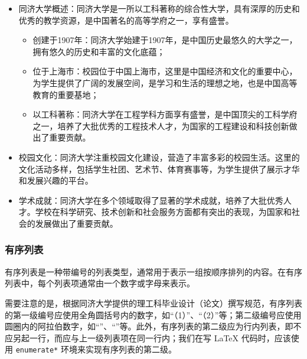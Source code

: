 \begin{itemize}
    \item 同济大学概述：同济大学是一所以工科著称的综合性大学，具有深厚的历史和优秀的教学资源，是中国著名的高等学府之一，享有盛誉。
    \begin{itemize}
        \item 创建于1907年：同济大学始建于1907年，是中国历史最悠久的大学之一，拥有悠久的历史和丰富的文化底蕴；
        \item 位于上海市：校园位于中国上海市，这里是中国经济和文化的重要中心，为学生提供了广阔的发展空间，是学习和生活的理想之地，也是中国高等教育的重要基地；
        \item 以工科著称：同济大学在工程学科方面享有盛誉，是中国顶尖的工科学府之一，培养了大批优秀的工程技术人才，为国家的工程建设和科技创新做出了重要贡献。
    \end{itemize}
    \item 校园文化：同济大学注重校园文化建设，营造了丰富多彩的校园生活。这里的文化活动多样，包括学生社团、艺术节、体育赛事等，为学生提供了展示才华和发展兴趣的平台。
    \item 学术成就：同济大学在多个领域取得了显著的学术成就，培养了大批优秀人才。学校在科学研究、技术创新和社会服务方面都有突出的表现，为国家和社会的发展做出了重要贡献。
\end{itemize}

\subsubsection{有序列表}

有序列表是一种带编号的列表类型，通常用于表示一组按顺序排列的内容。在有序列表中，每个列表项通常由一个数字或字母来表示。

需要注意的是，根据同济大学提供的理工科毕业设计（论文）撰写规范，有序列表的第一级编号应使用全角圆括号内的数字，如“（1）”、“（2）”等；第二级编号应使用圆圈内的阿拉伯数字，如“”、“”等。此外，有序列表的第二级应为行内列表，即不应另起一行，而应与上一级列表项在同一行内；我们在写 \LaTeX{} 代码时，应该使用 \texttt{enumerate*} 环境来实现有序列表的第二级。

